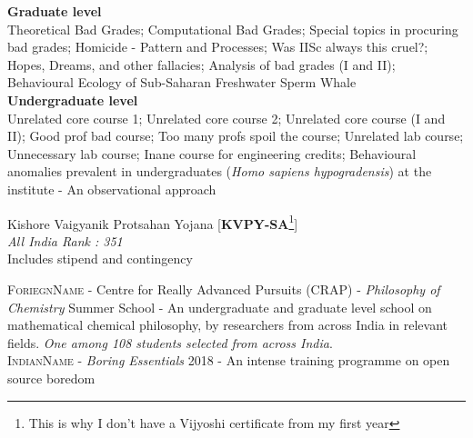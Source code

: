 \documentclass{article}
\begin{document}
\begin{addmargin}[0.75in]{0.75in}
	\reversemarginpar
	\noindent
	\textbf{Graduate level\\}
	Theoretical Bad Grades; Computational Bad Grades; Special topics in procuring bad grades; Homicide - Pattern and Processes; Was IISc always this cruel?; Hopes, Dreams, and other fallacies; Analysis of bad grades (I and II); Behavioural Ecology of Sub-Saharan Freshwater Sperm Whale\\

	\noindent
	\textbf{Undergraduate level\\}
	Unrelated core course 1; Unrelated core course 2; Unrelated core course (I and II); Good prof bad course; Too many profs spoil the course; Unrelated lab course; Unnecessary lab course; Inane course for engineering credits; Behavioural anomalies prevalent in undergraduates (\emph{Homo sapiens hypogradensis}) at the institute - An observational approach\\
\end{addmargin}
\begin{addmargin}[0.75in]{0.75in}
	\reversemarginpar
	\noindent
	Kishore Vaigyanik Protsahan Yojana [\textbf{KVPY-SA}\footnote{This is why I don't have a Vijyoshi certificate from my first year}]\normalmarginpar{}\\
	\emph{All India Rank : 351\\}
	Includes stipend and contingency\\

	
\end{addmargin}
\begin{addmargin}[0.75in]{0.75in}
	\reversemarginpar
	\noindent
	\textsc{ForiegnName} - Centre for Really Advanced Pursuits (CRAP) - \emph{Philosophy of Chemistry} Summer School \normalmarginpar{}- An undergraduate and graduate level school on mathematical chemical philosophy, by researchers from across India in relevant fields. \emph{One among 108 students selected from across India}.\\

	\noindent
	\textsc{IndianName} - \emph{Boring Essentials} 2018 - An intense training programme on \normalmarginpar{}open source boredom\\

\end{addmargin}
\end{document}
